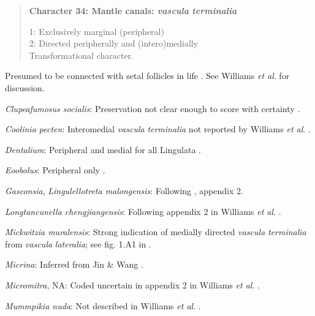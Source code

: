 \documentclass[openany]{book}
\theoremstyle{definition}
\theoremstyle{definition}
\theoremstyle{definition}
\theoremstyle{remark}
\begin{document}
\begin{quote}
\textbf{Character 34: Mantle canals: \emph{vascula} \emph{terminalia}}

1: Exclusively marginal (peripheral)\\
2: Directed peripherally and (intero)medially\\
Transformational character.
\end{quote}

Presumed to be connected with setal follicles in life
\citep{Williams1998Thediversity}. See Williams \emph{et al}.
\citeyearpar{Williams2000LinguliformeaCraniiformea} for discussion.

\hypertarget{Clupeafumosus_socialis-coding-34}{}
\emph{Clupeafumosus socialis}: Preservation not clear enough to score
with certainty \citep{Holmer2006Aspinose}.

\hypertarget{Coolinia_pecten-coding-34}{}
\emph{Coolinia pecten}: Interomedial \emph{vascula} \emph{terminalia}
not reported by Williams \emph{et al}.
\citeyearpar{Williams2000LinguliformeaCraniiformea}.

\hypertarget{Dentalium-coding-34}{}
\emph{Dentalium}: Peripheral and medial for all Lingulata
\citep{Williams2000LinguliformeaCraniiformea}.

\hypertarget{Eoobolus-coding-34}{}
\emph{Eoobolus}: Peripheral only
\citep[p.158]{Williams2000LinguliformeaCraniiformea}.

\hypertarget{Gasconsia-coding-34}{}
\emph{Gasconsia}, \emph{Lingulellotreta malongensis}: Following
\citet{Williams1998Thediversity}, appendix 2.

\hypertarget{Longtancunella_chengjiangensis-coding-34}{}
\emph{Longtancunella chengjiangensis}: Following appendix 2 in Williams
\emph{et al}. \citeyearpar{Williams1998Thediversity}.

\hypertarget{Mickwitzia_muralensis-coding-34}{}
\emph{Mickwitzia muralensis}: Strong indication of medially directed
\emph{vascula} \emph{terminalia} from \emph{vascula} \emph{lateralia};
see fig. 1.A1 in \citet{Balthasar2009EarlyCambrian}.

\hypertarget{Micrina-coding-34}{}
\emph{Micrina}: Inferred from Jin \& Wang
\citeyearpar{Jin1992Revisionof}.

\hypertarget{Micromitra-coding-34}{}
\emph{Micromitra}, NA: Coded uncertain in appendix 2 in Williams
\emph{et al}. \citeyearpar{Williams1998Thediversity}.

\hypertarget{Mummpikia_nuda-coding-34}{}
\emph{Mummpikia nuda}: Not described in Williams \emph{et al}.
\citeyearpar{Williams2000LinguliformeaCraniiformea}.
\end{document}
